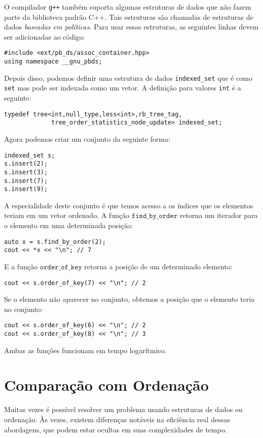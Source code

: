 O compilador \texttt{g++} também suporta
algumas estruturas de dados que não fazem parte
da biblioteca padrão C++.
Tais estruturas são chamadas de estruturas de dados
\emph{baseadas em políticas}.
Para usar essas estruturas, as seguintes linhas
devem ser adicionadas ao código:
\begin{lstlisting}
#include <ext/pb_ds/assoc_container.hpp>
using namespace __gnu_pbds; 
\end{lstlisting}
Depois disso, podemos definir uma estrutura de dados \texttt{indexed\_set} que
é como \texttt{set} mas pode ser indexada como um vetor.
A definição para valores \texttt{int} é a seguinte:
\begin{lstlisting}
typedef tree<int,null_type,less<int>,rb_tree_tag,
             tree_order_statistics_node_update> indexed_set; 
\end{lstlisting}
Agora podemos criar um conjunto da seguinte forma:
\begin{lstlisting}
indexed_set s;
s.insert(2);
s.insert(3);
s.insert(7);
s.insert(9);
\end{lstlisting}
A especialidade deste conjunto é que temos acesso a
os índices que os elementos teriam em um vetor ordenado.
A função $\texttt{find\_by\_order}$ retorna
um iterador para o elemento em uma determinada posição:
\begin{lstlisting}
auto x = s.find_by_order(2);
cout << *x << "\n"; // 7
\end{lstlisting}
E a função $\texttt{order\_of\_key}$
retorna a posição de um determinado elemento:
\begin{lstlisting}
cout << s.order_of_key(7) << "\n"; // 2
\end{lstlisting}
Se o elemento não aparecer no conjunto,
obtemos a posição que o elemento teria
no conjunto:
\begin{lstlisting}
cout << s.order_of_key(6) << "\n"; // 2
cout << s.order_of_key(8) << "\n"; // 3
\end{lstlisting}
Ambas as funções funcionam em tempo logarítmico.

\section{Comparação com Ordenação}

Muitas vezes é possível resolver um problema
usando estruturas de dados ou ordenação.
Às vezes, existem diferenças notáveis
na eficiência real dessas abordagens,
que podem estar ocultas em suas complexidades de tempo.

